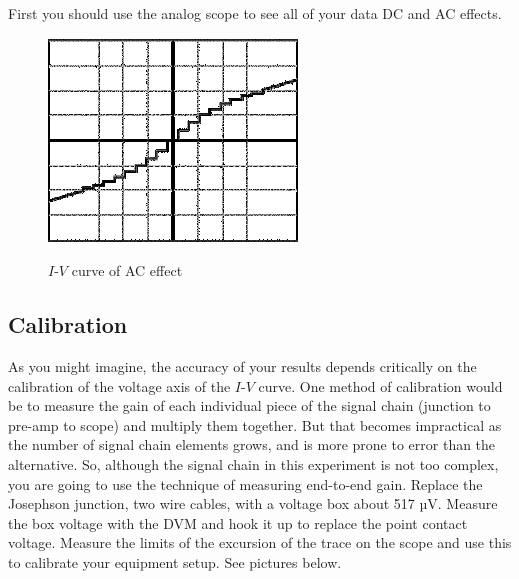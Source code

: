 \documentclass{../lab}
\begin{document}
First you should use the analog scope to see all of your data DC and AC effects.

\begin{figure}[h]
    \centering
    \href{http://experimentationlab.berkeley.edu/sites/default/files/images/250px-JOS17.gif}{\includegraphics[width=0.5\linewidth]{images/250px-JOS17.png}}
    \caption{$I$-$V$ curve of AC effect}
    \label{fig:IVCurveOfACEffect}
\end{figure}



\subsection{Calibration}

As you might imagine, the accuracy of your results depends critically on the calibration of the voltage axis of the $I$-$V$ curve. One method of calibration would be to measure the gain of each individual piece of the signal chain (junction to pre-amp to scope) and multiply them together. But that becomes impractical as the number of signal chain elements grows, and is more prone to error than the alternative. So, although the signal chain in this experiment is not too complex, you are going to use the technique of measuring end-to-end gain. Replace the Josephson junction, two wire cables, with a voltage box about 517 µV. Measure the box voltage with the DVM and hook it up to replace the point contact voltage. Measure the limits of the excursion of the trace on the scope and use this to calibrate your equipment setup. See pictures below.
\end{document}
